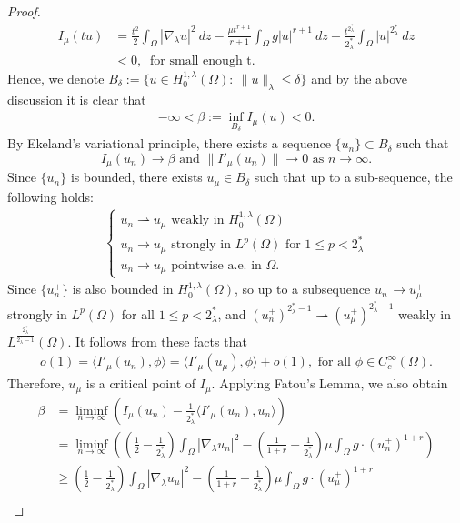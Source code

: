 \documentclass[12pt, notitlepage]{article}
\begin{document}
{\begin{proof}
\begin{align}
    I_\mu(tu)&=\frac{t^2}{2}\int_\Omega |\nabla_\lambda u|^2\ dz-\frac{\mu t^{r+1}}{r+1}\int_\Omega g |u|^{r+1}\ dz - \frac{t^{2^*_\lambda}}{2^*_\lambda}\int_\Omega |u|^{2^*_\lambda}\ dz\nonumber\\
    &<0,\ \text{ for small enough t. }
\end{align}
Hence, we denote $B_\delta:=\{u\in H^{1,\lambda}_0(\Omega):\ \|u\|_\lambda\leq\delta\}$ and by the above discussion it is clear that
\begin{align}
    -\infty<\beta:=\inf_{B_\delta} I_\mu(u)<0.
\end{align}
By Ekeland's variational principle, there exists a sequence $\{u_n\}\subset B_\delta$ such that $$I_\mu(u_n)\to \beta\text{ and } \|I'_\mu(u_n)\|\to 0\text{ as } n\to\infty.$$
Since $\{u_n\}$ is bounded, there exists $u_\mu\in B_\delta$ such that up to a sub-sequence, the following holds:
\begin{align}\label{T3}
    \begin{cases}
        u_n\rightharpoonup u_\mu \text{ weakly in } H^{1,\lambda}_0(\Omega)\\
        u_n\to u_\mu \text{ strongly in } L^p(\Omega) \text{ for } 1\leq p<2^*_\lambda\\
        u_n\to u_\mu \text{ pointwise a.e. in } \Omega.
    \end{cases}
\end{align}
Since $\{u_n^+\}$ is also bounded in $H^{1,\lambda}_0(\Omega)$, so up to a subsequence $u_n^+\to u_\mu^+$ strongly in $L^p(\Omega)$ for all $1\leq p<2^*_\lambda$, and  $(u_n^+)^{2^*_\lambda-1}\rightharpoonup (u_\mu^+)^{2^*_\lambda-1}$ weakly in $L^\frac{2^*_\lambda}{2^*_\lambda-1}(\Omega)$. It follows from these facts that 
\begin{align}
    o(1)=\langle I'_\mu(u_n),\phi\rangle=\langle I'_\mu(u_\mu),\phi\rangle+o(1),\text{ for all } \phi\in C^\infty_c(\Omega).
\end{align}
Therefore, $u_\mu$ is a critical point of $I_\mu.$ Applying Fatou's Lemma, we also obtain
\begin{align}
   \beta&=\liminf_{n\to\infty} \left ( I_\mu(u_n)-\frac{1}{2^*_\lambda}\langle I'_\mu(u_n),u_n\rangle\right )\nonumber\\
   &=\liminf_{n\to\infty}\left ( (\frac{1}{2}-\frac{1}{2^*_\lambda})\int_\Omega |\nabla_\lambda u_n|^2-(\frac{1}{1+r}-\frac{1}{2^*_\lambda})\mu\int_\Omega g\cdot(u^+_n)^{1+r}\right )\nonumber\\
    &\geq(\frac{1}{2}-\frac{1}{2^*_\lambda})\int_\Omega |\nabla_\lambda u_\mu|^2-(\frac{1}{1+r}-\frac{1}{2^*_\lambda})\mu\int_\Omega g\cdot(u^+_\mu)^{1+r}\nonumber\\

\end{align}
\end{proof}}
\end{document}
